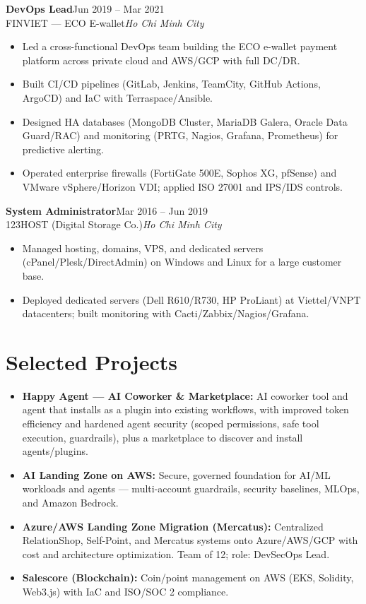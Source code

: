 \documentclass[a4paper,10pt]{article}
\newcommand{\role}[4]{%
  \textbf{#1}\hfill{\color{muted}\small #3}\\[1pt]
  {\color{accent}#2}\hfill{\color{muted}\small\textit{#4}}\par\vspace{3pt}}
\begin{document}
\role{DevOps Lead}{FINVIET --- ECO E-wallet}{Jun 2019 -- Mar 2021}{Ho Chi Minh City}
\begin{itemize}
  \item Led a cross-functional DevOps team building the ECO e-wallet payment platform across
        private cloud and AWS/GCP with full DC/DR.
  \item Built CI/CD pipelines (GitLab, Jenkins, TeamCity, GitHub Actions, ArgoCD) and IaC with
        Terraspace/Ansible.
  \item Designed HA databases (MongoDB Cluster, MariaDB Galera, Oracle Data Guard/RAC) and
        monitoring (PRTG, Nagios, Grafana, Prometheus) for predictive alerting.
  \item Operated enterprise firewalls (FortiGate 500E, Sophos XG, pfSense) and VMware
        vSphere/Horizon VDI; applied ISO 27001 and IPS/IDS controls.
\end{itemize}

\role{System Administrator}{123HOST (Digital Storage Co.)}{Mar 2016 -- Jun 2019}{Ho Chi Minh City}
\begin{itemize}
  \item Managed hosting, domains, VPS, and dedicated servers (cPanel/Plesk/DirectAdmin) on
        Windows and Linux for a large customer base.
  \item Deployed dedicated servers (Dell R610/R730, HP ProLiant) at Viettel/VNPT datacenters;
        built monitoring with Cacti/Zabbix/Nagios/Grafana.
\end{itemize}

\section{Selected Projects}
\begin{itemize}
  \item \textbf{Happy Agent --- AI Coworker \& Marketplace:} AI coworker tool and agent that
        installs as a plugin into existing workflows, with improved token efficiency and
        hardened agent security (scoped permissions, safe tool execution, guardrails), plus a
        marketplace to discover and install agents/plugins.
  \item \textbf{AI Landing Zone on AWS:} Secure, governed foundation for AI/ML workloads and
        agents --- multi-account guardrails, security baselines, MLOps, and Amazon Bedrock.
  \item \textbf{Azure/AWS Landing Zone Migration (Mercatus):} Centralized RelationShop,
        Self-Point, and Mercatus systems onto Azure/AWS/GCP with cost and architecture
        optimization. Team of 12; role: DevSecOps Lead.
  \item \textbf{Salescore (Blockchain):} Coin/point management on AWS (EKS, Solidity, Web3.js)
        with IaC and ISO/SOC 2 compliance.
\end{itemize}
\end{document}
